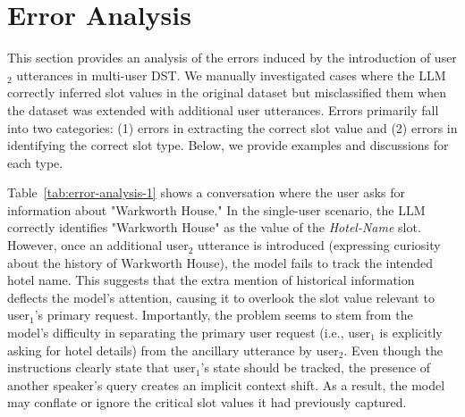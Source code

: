 \begin{table}[]
\centering
\caption{Performance of GPT-4o on clean dialogues without inconsistent slots.}
\label{tab:performance-clean}
\end{table}

\section{Error Analysis}
\label{app:error-analysis}

This section provides an analysis of the errors induced by the introduction of user$_2$ utterances in multi-user DST. We manually investigated cases where the LLM correctly inferred slot values in the original dataset but misclassified them when the dataset was extended with additional user utterances. Errors primarily fall into two categories: (1) errors in extracting the correct slot value and (2) errors in identifying the correct slot type. Below, we provide examples and discussions for each type.

Table~\ref{tab:error-analysis-1} shows a conversation where the user asks for information about "Warkworth House." In the single-user scenario, the LLM correctly identifies "Warkworth House" as the value of the \textit{Hotel-Name} slot. However, once an additional user$_2$ utterance is introduced (expressing curiosity about the history of Warkworth House), the model fails to track the intended hotel name. This suggests that the extra mention of historical information deflects the model’s attention, causing it to overlook the slot value relevant to user$_1$’s primary request. Importantly, the problem seems to stem from the model’s difficulty in separating the primary user request (i.e., user$_1$ is explicitly asking for hotel details) from the ancillary utterance by user$_2$. Even though the instructions clearly state that user$_1$’s state should be tracked, the presence of another speaker’s query creates an implicit context shift. As a result, the model may conflate or ignore the critical slot values it had previously captured.

